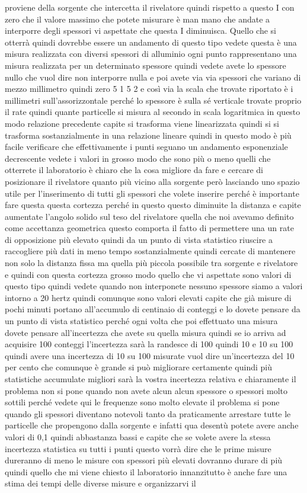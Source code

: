 {proviene della sorgente che intercetta il rivelatore quindi rispetto a questo I con zero che il valore massimo che potete misurare è man mano che andate a interporre degli spessori vi aspettate che questa I diminuisca. Quello che si otterrà quindi dovrebbe essere un andamento di questo tipo vedete questa è una misura realizzata con diversi spessori di alluminio ogni punto rappresentano una misura realizzata per un determinato spessore quindi vedete avete lo spessore nullo che vuol dire non interporre nulla e poi avete via via spessori che variano di mezzo millimetro quindi zero 5 1 5 2 e così via la scala che trovate riportato è i millimetri sull'assorizzontale perché lo spessore è sulla sé verticale trovate proprio il rate quindi quante particelle si misura al secondo in scala logaritmica in questo modo relazione precedente capite si trasforma viene linearizzata quindi si si trasforma sostanzialmente in una relazione lineare quindi in questo modo è più facile verificare che effettivamente i punti seguano un andamento esponenziale decrescente vedete i valori in grosso modo che sono più o meno quelli che otterrete il laboratorio è chiaro che la cosa migliore da fare e cercare di posizionare il rivelatore quanto più vicino alla sorgente però lasciando uno spazio utile per l'inserimento di tutti gli spessori che volete inserire perché è importante fare questa questa cortezza perché in questo questo diminuite la distanza e capite aumentate l'angolo solido sul teso del rivelatore quella che noi avevamo definito come accettanza geometrica questo comporta il fatto di permettere una un rate di opposizione più elevato quindi da un punto di vista statistico riuscire a raccogliere più dati in meno tempo sostanzialmente quindi cercate di mantenere non solo la distanza fissa ma quella più piccola possibile tra sorgente e rivelatore e quindi con questa cortezza grosso modo quello che vi aspettate sono valori di questo tipo quindi vedete quando non interponete nessuno spessore siamo a valori intorno a 20 hertz quindi comunque sono valori elevati capite che già misure di pochi minuti portano all'accumulo di centinaio di conteggi e lo dovete pensare da un punto di vista statistico perché ogni volta che poi effettuato una misura dovete pensare all'incertezza che avete su quella misura quindi se io arriva ad acquisire 100 conteggi l'incertezza sarà la randesce di 100 quindi 10 e 10 su 100 quindi avere una incertezza di 10 su 100 misurate vuol dire un'incertezza del 10 per cento che comunque è grande si può migliorare certamente quindi più statistiche accumulate migliori sarà la vostra incertezza relativa e chiaramente il problema non si pone quando non avete alcun alcun spessore o spessori molto sottili perché vedete qui le frequenze sono molto elevate il problema si pone quando gli spessori diventano notevoli tanto da praticamente arrestare tutte le particelle che propengono dalla sorgente e infatti qua desentù potete avere anche valori di 0,1 quindi abbastanza bassi e capite che se volete avere la stessa incertezza statistica su tutti i punti questo vorrà dire che le prime misure dureranno di meno le misure con spessori più elevati dovranno durare di più quindi quello che mi viene chiesto il laboratorio innanzitutto è anche fare una stima dei tempi delle diverse misure e organizzarvi il }
